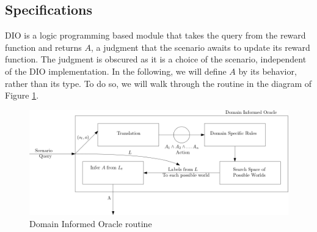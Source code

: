 \subsection{Specifications} \label{scspecs}
DIO is a logic programming based module that takes the query from the reward function and returns $A$, a judgment that the scenario awaits to update its reward function. The judgment is obscured as it is a choice of the scenario, 
independent of the DIO implementation. In the following, we will define $A$ by its behavior, rather than its type. To do so, we will walk through the routine in the diagram of Figure \ref{fig:diospecs}.


\begin{figure}[H]
  \centering
  \includegraphics[scale=0.46]{figures/diospecs.png}
  \caption{Domain Informed Oracle routine}
  \label{fig:diospecs}
\end{figure}

